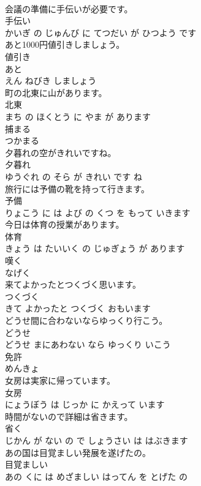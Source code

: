 \documentclass[8pt]{extreport}
\begin{document}
\begin{CJK}{UTF8}{min}
\\	会議の準備に手伝いが必要です。	
\\	手伝い 
\\	かいぎ の じゅんび に てつだい が ひつよう です			
\\	あと1000円値引きしましょう。	
\\	値引き 
\\	あと 
\\	えん ねびき しましょう			
\\	町の北東に山があります。	
\\	北東 
\\	まち の ほくとう に やま が あります			
\\	捕まる	
\\	つかまる		
\\	夕暮れの空がきれいですね。	
\\	夕暮れ 
\\	ゆうぐれ の そら が きれい です ね			
\\	旅行には予備の靴を持って行きます。	
\\	予備 
\\	りょこう に は よび の くつ を もって いきます			
\\	今日は体育の授業があります。	
\\	体育 
\\	きょう は たいいく の じゅぎょう が あります			
\\	嘆く	
\\	なげく		
\\	来てよかったとつくづく思います。	
\\	つくづく 
\\	きて よかったと つくづく おもいます			
\\	どうせ間に合わないならゆっくり行こう。	
\\	どうせ 
\\	どうせ まにあわない なら ゆっくり いこう			
\\	免許	
\\	めんきょ		
\\	女房は実家に帰っています。	
\\	女房 
\\	にょうぼう は じっか に かえって います			
\\	時間がないので詳細は省きます。	
\\	省く 
\\	じかん が ない の で しょうさい は はぶきます			
\\	あの国は目覚ましい発展を遂げたの。	
\\	目覚ましい 
\\	あの くに は めざましい はってん を とげた の			

\end{CJK}
\end{document}

